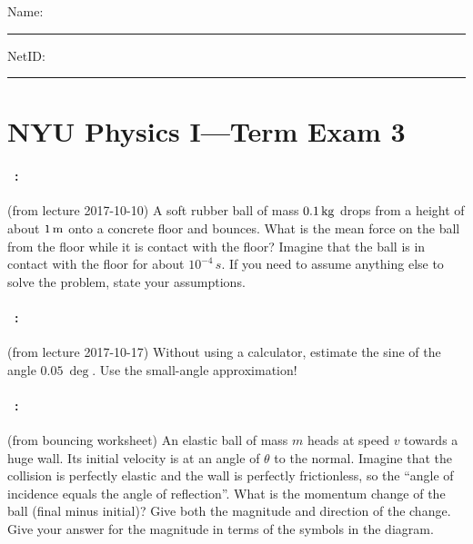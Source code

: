 \documentclass[12pt]{article} 
\begin{document}
\noindent
Name: \rule[-1ex]{0.55\textwidth}{0.1pt}
NetID: \rule[-1ex]{0.2\textwidth}{0.1pt}

\section*{NYU Physics I---Term Exam 3}

\paragraph{\problemname~\theproblem:}%
(from lecture 2017-10-10)
A soft rubber ball of mass $0.1\,\mathrm{kg}$ drops from a height of about
$1\,\mathrm{m}$ onto a concrete floor and bounces. What is the mean force on
the ball from the floor while it is contact with the floor? Imagine
that the ball is in contact with the floor for about $10^{-4}\,s$. If
you need to assume anything else to solve the problem, state your
assumptions.

\vfill

\paragraph{\problemname~\theproblem:}%
(from lecture 2017-10-17)
Without using a calculator, estimate the sine of the angle $0.05~\deg$.
Use the small-angle approximation!

\vfill

\paragraph{\problemname~\theproblem:}%
(from bouncing worksheet)
An elastic ball of mass $m$ heads at speed $v$ towards a huge wall.
Its initial velocity is at an angle of $\theta$ to the normal.
Imagine that the collision is perfectly elastic and the
wall is perfectly frictionless, so the ``angle of incidence equals the
angle of reflection''. What is the momentum change of the ball (final
minus initial)? Give both the magnitude and direction of the change.
Give your answer for the magnitude in terms of the symbols in the diagram.
\end{document}
